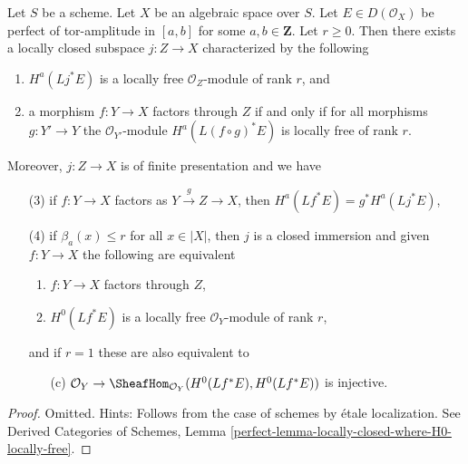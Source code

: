 \begin{lemma}
\label{lemma-locally-closed-where-H0-locally-free}
Let $S$ be a scheme. Let $X$ be an algebraic space over $S$.
Let $E \in D(\mathcal{O}_X)$ be perfect
of tor-amplitude in $[a, b]$ for some $a, b \in \mathbf{Z}$.
Let $r \geq 0$.
Then there exists a locally closed subspace $j : Z \to X$
characterized by the following
\begin{enumerate}
\item $H^a(Lj^*E)$ is a locally free $\mathcal{O}_Z$-module of rank $r$, and
\item a morphism $f : Y \to X$ factors through $Z$ if and only if
for all morphisms $g : Y' \to Y$ the $\mathcal{O}_{Y'}$-module
$H^a(L(f \circ g)^*E)$ is locally free of rank $r$.
\end{enumerate}
Moreover, $j : Z \to X$ is of finite presentation and we have
\begin{enumerate}
\item[(3)] if $f : Y \to X$ factors as $Y \xrightarrow{g} Z \to X$, then
$H^a(Lf^*E) = g^*H^a(Lj^*E)$,
\item[(4)] if $\beta_a(x) \leq r$ for all $x \in |X|$, then $j$ is
a closed immersion and given $f : Y \to X$ the following are equivalent
\begin{enumerate}
\item $f : Y \to X$ factors through $Z$,
\item $H^0(Lf^*E)$ is a locally free $\mathcal{O}_Y$-module of rank $r$,
\end{enumerate}
and if $r = 1$ these are also equivalent to
\begin{enumerate}
\item[(c)] $\mathcal{O}_Y \to \SheafHom_{\mathcal{O}_Y}(H^0(Lf^*E), H^0(Lf^*E))$
is injective.
\end{enumerate}
\end{enumerate}
\end{lemma}

\begin{proof}
Omitted. Hints:
Follows from the case of schemes by \'etale localization. See
Derived Categories of Schemes, Lemma
\ref{perfect-lemma-locally-closed-where-H0-locally-free}.
\end{proof}

